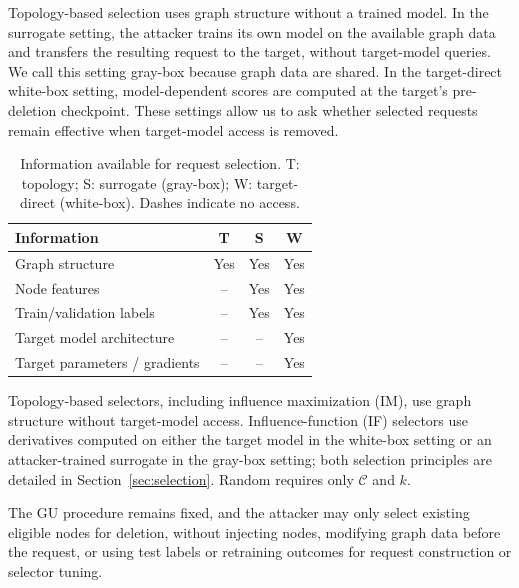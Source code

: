 \begin{table}[!ht]
\begin{minipage}[t]{0.43\linewidth}
\vspace{0pt}
Topology-based selection uses graph structure without a trained model. In the surrogate setting, the attacker trains its own model on the available graph data and transfers the resulting request to the target, without target-model queries. We call this setting gray-box because graph data are shared. In the target-direct white-box setting, model-dependent scores are computed at the target's pre-deletion checkpoint. These settings allow us to ask whether selected requests remain effective when target-model access is removed.
\end{minipage}\hfill
\begin{minipage}[t]{0.54\linewidth}
\vspace{0pt}
\centering
\caption{Information available for request selection. T: topology; S: surrogate (gray-box); W: target-direct (white-box). Dashes indicate no access.}
\label{tab:attacker-access}
\small
\setlength{\tabcolsep}{4pt}
\begin{tabular}{@{}lccc@{}}
\toprule
Information & T & S & W \\
\midrule
Graph structure & Yes & Yes & Yes \\
Node features & -- & Yes & Yes \\
Train/validation labels & -- & Yes & Yes \\
Target model architecture & -- & -- & Yes \\
Target parameters / gradients & -- & -- & Yes \\
\bottomrule
\end{tabular}
\end{minipage}
\end{table}

Topology-based selectors, including influence maximization (IM), use graph structure without target-model access. Influence-function (IF) selectors use derivatives computed on either the target model in the white-box setting or an attacker-trained surrogate in the gray-box setting; both selection principles are detailed in Section~\ref{sec:selection}. Random requires only $\mathcal C$ and $k$.

The GU procedure remains fixed, and the attacker may only select existing eligible nodes for deletion, without injecting nodes, modifying graph data before the request, or using test labels or retraining outcomes for request construction or selector tuning.
